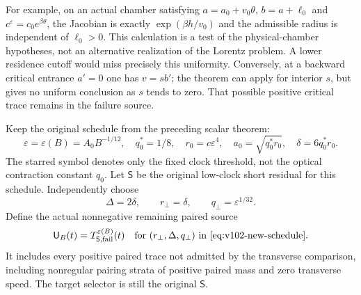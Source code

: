 For example, on an actual chamber satisfying
$a=a_0+v_0\theta$, $b=a+\ell_0$ and
$c^\varepsilon=c_0e^{\beta\theta}$, the Jacobian is exactly
$\exp(\beta h/v_0)$ and the admissible radius is independent of
$\ell_0>0$. This calculation is a test of the physical-chamber
hypotheses, not an alternative realization of the Lorentz problem.
A lower residence cutoff would miss precisely this uniformity.
Conversely, at a backward critical entrance $a'=0$ one has
$v=s b'$; the theorem can apply for interior $s$, but gives no
uniform conclusion as $s$ tends to zero. That possible positive
critical trace remains in the failure source.

Keep the original schedule from the preceding scalar theorem:
\[
 \varepsilon=\varepsilon(B)=A_0B^{-1/12},\quad
 q_0^*=1/8,\quad r_0=c\varepsilon^4,\quad
 a_0=\sqrt{q_0^*r_0},\quad\delta=6q_0^*r_0.
\]
The starred symbol denotes only the fixed clock threshold, not the
optical contraction constant $q_0$. Let $\mathsf S$ be the original
low-clock short residual for this schedule. Independently choose
\begin{equation}\label{eq:v102-new-schedule}
 \Delta=2\delta,\qquad r_\perp=\delta,\qquad
                         q_\perp=\varepsilon^{1/32}.
\end{equation}
Define the actual nonnegative remaining paired source
\begin{equation}\label{eq:v102-transverse-residual}
 \mathsf U_B(t)=T_{\mathsf S,\mathrm{fail}}^{\varepsilon(B)}(t)
       \quad\text{for }(r_\perp,\Delta,q_\perp)
                  \text{ in }\eqref{eq:v102-new-schedule}.
\end{equation}
It includes every positive paired trace not admitted by the
transverse comparison, including nonregular pairing strata of
positive paired mass and zero transverse speed. The target selector
is still the original $\mathsf S$.

